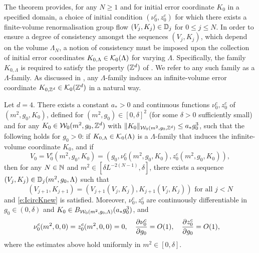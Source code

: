 The theorem provides, for any $N \ge 1$ and for initial error coordinate $K_0$
in a specified domain, a choice of initial condition $(\nu_0^c,z_0^c)$
for which there exists
a finite-volume renormalisation group flow $(V_j, K_j) \in \mathbb{D}_j$ for $0 \le j \le N$.
In order to ensure a degree of consistency amongst the sequences $(V_j, K_j)$, which depend on
the volume $\Lambda_N$, a notion of consistency must be imposed upon the collection of initial
error coordinates $K_{0,\Lambda} \in \mathcal{K}_0(\Lambda)$ for varying $\Lambda$.
Specifically, the family $K_{0,\Lambda}$ is required to satisfy the property $({ {{\mathbb Z}}^d })$ of
\cite[Definition~\ref{step-defn:KZd}]{BS-rg-step}.
We refer to any such family as a $\Lambda$-family.
As discussed in \cite[Definition~\ref{step-defn:KZd}]{BS-rg-step},
any $\Lambda$-family
induces an infinite-volume error coordinate $K_{0,{ {{\mathbb Z}}^d }} \in \mathcal{K}_0({ {{\mathbb Z}}^d })$ in a natural way.

\begin{theorem}
\label{thm:flow-flow}
Let $d = 4$.
There exists a constant $a_* > 0$ and continuous functions $\nu_0^c, z_0^c$
of $(m^2, g_0, K_0)$, defined for $(m^2, g_0) \in [0, \delta]^2$
(for some $\delta > 0$ sufficiently small) and for any $K_0 \in \mathcal{W}_0(m^2, g_0, { {{\mathbb Z}}^d })$
with $\|K_0\|_{\mathcal{W}_0(m^2, g_0, { {{\mathbb Z}}^d })} \leq a_* g_0^3$, such that
the following holds for $g_0 > 0$:
if $K_{0,\Lambda} \in \mathcal{K}_0(\Lambda)$ is a $\Lambda$-family
that induces the infinite-volume coordinate $K_0$, and if
\begin{equation}
\label{e:flow-flow-ic}
V_0 = V_0^c(m^2, g_0, K_0) = (g_0, \nu_0^c(m^2,g_0,K_0), z_0^c(m^2,g_0,K_0)),
\end{equation}
then for any $N \in {\mathbb N}$ and $m^2 \in [\delta L^{-2 (N - 1)}, \delta]$,
there exists a sequence $(V_j, K_j) \in \mathbb{D}_j(m^2, g_0, \Lambda)$
such that
\begin{equation}
  \label{e:VjKjDj}
  (V_{j+1},K_{j+1}) = (V_{j+1}(V_j, K_j), K_{j+1}(V_j, K_j)) \text{ for all } j < N
\end{equation}
and \eqref{e:IcircKnew} is satisfied.
Moreover, $\nu_0^c,z_0^c$ are continuously differentiable in
$g_0 \in (0, \delta)$ and $K_0 \in B_{\mathcal{W}_0(m^2, g_0, \Lambda)}(a_* g_0^3)$, and
\begin{align}
&\nu_0^c(m^2,0,0) = z_0^c(m^2,0,0) = 0,
\quad
\frac{\partial \nu_0^c}{\partial g_0} = O(1),
\quad
\label{e:z0est}
\frac{\partial z_0^c}{\partial g_0} = O(1),
\end{align}
where the estimates above hold uniformly in $m^2 \in [0, \delta]$.
\end{theorem}

